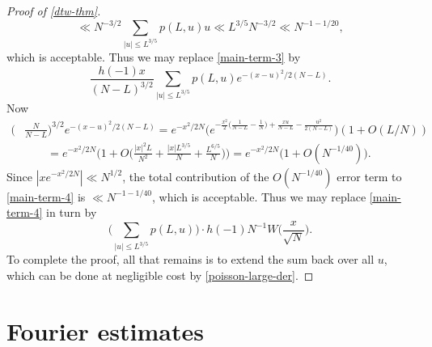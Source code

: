 \documentclass[11pt,reqno]{amsart}
\numberwithin{equation}{section}
\theoremstyle{definition}
\theoremstyle{remark}
\renewcommand{\le}{\leqslant}
\begin{document}
\begin{proof}[Proof of \cref{dtw-thm}]
\[ \ll N^{-3/2}\sum_{|u| \le L^{3/5}} p(L,u) u \ll L^{3/5} N^{-3/2} \ll N^{-1 - 1/20}, \] which is acceptable. Thus we may replace \cref{main-term-3} by
\begin{equation}\label{main-term-4} \frac{h(-1) x}{(N - L)^{3/2}} \sum_{|u| \le L^{3/5}} p(L, u)  e^{-(x - u)^2/2(N - L)}.\end{equation} 
Now 
\begin{align*} \big( & \frac{N}{N - L}\big)^{3/2} e^{-(x - u)^2/2(N - L)}  = e^{-x^2/2N} \Big( e^{-\frac{x^2}{2} \big(\frac{1}{N - L} - \frac{1}{N}\big) + \frac{xu}{N - L} - \frac{u^2}{2(N - L)}}\Big) (1 + O(L/N)) \\ & \qquad = e^{-x^2/2N} \Big( 1 + O \big( \frac{|x|^2 L}{N^2} + \frac{|x|L^{3/5}}{N} + \frac{L^{6/5}}{N}\big)\Big) = e^{-x^2/2N} \big(1 + O(N^{-1/40})\big).\end{align*} 
Since $|x e^{-x^2/2N}| \ll N^{1/2}$, the total contribution of the $O(N^{-1/40})$ error term to \cref{main-term-4} is $\ll N^{-1 -1/40}$, which is acceptable. Thus we may replace \cref{main-term-4} in turn by 
\[ \big(\sum_{|u| \le L^{3/5}} p(L,u)\big) \cdot h(-1) N^{-1} W\big( \frac{x}{\sqrt{N}}\big).\]
To complete the proof, all that remains is to extend the sum back over all $u$, which can be done at negligible cost by \cref{poisson-large-der}.
\end{proof}


\section{Fourier estimates} \label{appB}
\end{document}
